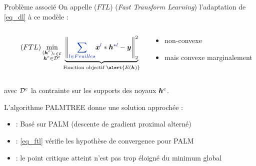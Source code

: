 \begin{frame}{Problème associé}
On appelle (${FTL}$) (\emph{Fast Transform Learning}) l'adaptation de \eqref{eq_dl} à ce modèle :

\begin{columns}
	

\begin{column}{0.7\linewidth}
\begin{equation*}
\tag{${FTL}$} \min_{\substack{(\h^e)_{e \in \E} \\ \h^e \in \Dspace^e}}
	\underbrace{\norm{\Beq{\sum_{l \in Feuilles}} \x^{\Beq{l}} * \h^{*\Beq{l}} -\y}{2}^2}_{\text{Fonction objectif } \alert{E(\h)}}  \label{eq_ftl} \notag
\end{equation*}
\end{column}
\begin{column}{0.3\linewidth}
\begin{itemize}
	\item[\xmark] non-convexe
	\item[\cmark] mais convexe marginalement
\end{itemize}
\end{column}
\end{columns}
avec ${\mathcal D}^e$ la contrainte sur les supports des noyaux $\bm{h}^e$.

L'algorithme \alert{PALMTREE} donne une solution approchée :
\begin{itemize}
	\item \cite{bolte_proximal_2014} : Basé sur PALM (descente de gradient proximal alterné)
	\item \cite{chabiron_toward_2015} : \eqref{eq_ftl} vérifie les hypothèse de convergence pour PALM
	\item \cite{chabiron_optimization_2016} : le point  critique atteint n'est pas trop éloigné du minimum global
\end{itemize}
\end{frame}

